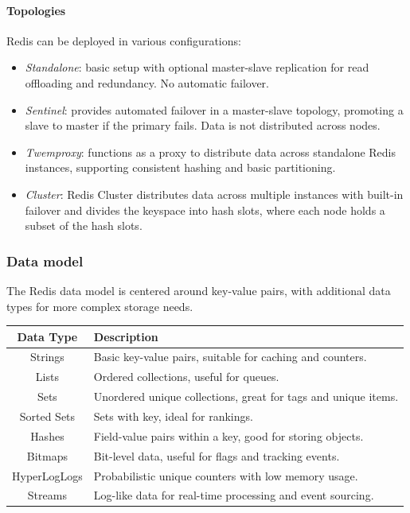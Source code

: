 \paragraph*{Topologies}
Redis can be deployed in various configurations:
\begin{itemize}
    \item \textit{Standalone}: basic setup with optional master-slave replication for read offloading and redundancy. 
        No automatic failover.
    \item \textit{Sentinel}: provides automated failover in a master-slave topology, promoting a slave to master if the primary fails. 
        Data is not distributed across nodes.
    \item \textit{Twemproxy}: functions as a proxy to distribute data across standalone Redis instances, supporting consistent hashing and basic partitioning.
    \item \textit{Cluster}: Redis Cluster distributes data across multiple instances with built-in failover and divides the keyspace into hash slots, where each node holds a subset of the hash slots.
\end{itemize}

\subsubsection{Data model}
The Redis data model is centered around key-value pairs, with additional data types for more complex storage needs.
\begin{table}[H]
    \centering
    \begin{tabular}{|c|l|}
    \hline
    \textbf{Data Type} & \textbf{Description} \\ \hline
    Strings            & Basic key-value pairs, suitable for caching and counters. \\ \hline
    Lists              & Ordered collections, useful for queues. \\ \hline
    Sets               & Unordered unique collections, great for tags and unique items. \\ \hline
    Sorted Sets        & Sets with key, ideal for rankings. \\ \hline
    Hashes             & Field-value pairs within a key, good for storing objects. \\ \hline
    Bitmaps            & Bit-level data, useful for flags and tracking events. \\ \hline
    HyperLogLogs       & Probabilistic unique counters with low memory usage. \\ \hline
    Streams            & Log-like data for real-time processing and event sourcing. \\ \hline
    \end{tabular}
\end{table}

